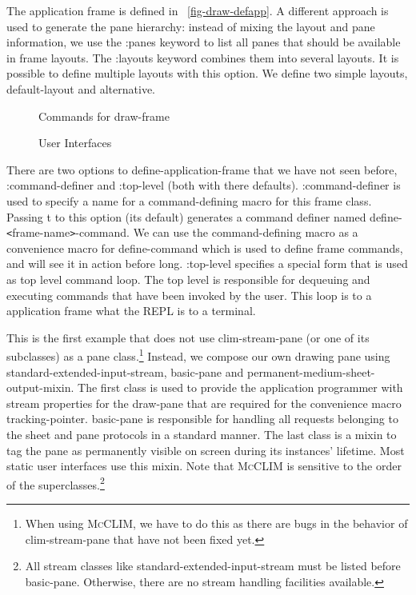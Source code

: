 \documentclass[twocolumn,a4paper]{article}
\newcommand {\code}[1]{{\sffamily #1}}
\newcommand {\mcclim}{\textsc{McCLIM}}
\let\class\code
\let\method\code
\let\constant\code
\let\macro\code
\let\keyword\code
\begin{document}
The application frame is defined in
\figurename~\ref{fig-draw-defapp}. A different approach is used to
generate the pane hierarchy: instead of mixing the layout and pane
information, we use the \keyword{:panes} keyword to list all panes
that should be available in frame layouts. The \keyword{:layouts}
keyword combines them into several layouts. It is possible to define
multiple layouts with this option. We define two simple layouts,
\code{default-layout} and \code{alternative}.

\begin{figure*}[t]
\lstset{style=framestyle}

\caption{Commands for \class{draw-frame}}\label{fig-draw-commands}
\end{figure*}

\begin{figure*}
\lstset{style=framestyle}

\caption{User Interfaces}\label{fig-draw-interfacing}
\end{figure*}

There are two options to \macro{define-application-frame} that we have
not seen before, \keyword{:command-definer} and \keyword{:top-level}
(both with there defaults). \keyword{:command-definer} is used to
specify a name for a command-defining macro for this frame
class. Passing \constant{t} to this option (its default) generates a
command definer named
\macro{define-\texttt{<}frame-name\texttt{>}-command}. We can use the
command-defining macro as a convenience macro for
\method{define-command} which is used to define frame commands, and 
will see it in action before long. \keyword{:top-level} specifies a
special form that is used as top level command loop. The top level is
responsible for dequeuing and executing commands that have been
invoked by the user. This loop is to a application frame what the REPL
is to a terminal.

This is the first example that does not use \class{clim-stream-pane}
(or one of its subclasses) as a pane class.\footnote{When using \mcclim{},
we have to do this as there are bugs in the behavior of
\class{clim-stream-pane} that have not been fixed yet.} Instead, we
compose our own drawing pane using
\class{standard-extended-input-stream}, \class{basic-pane} and
\class{permanent-medium-sheet-output-mixin}. The first class is used
to provide the application programmer with stream properties for the
draw-pane that are required for the convenience macro
\macro{tracking-pointer}. \class{basic-pane} is responsible for
handling all requests belonging to the sheet and pane protocols in a
standard manner. The last class is a mixin to tag the pane as
permanently visible on screen during its instances' lifetime. Most
static user interfaces use this mixin. Note that \mcclim{} is sensitive
to the order of the superclasses.\footnote{All stream classes like
\class{standard-extended-input-stream} must be listed before
\class{basic-pane}. Otherwise, there are no stream handling facilities
available.}
\end{document}
